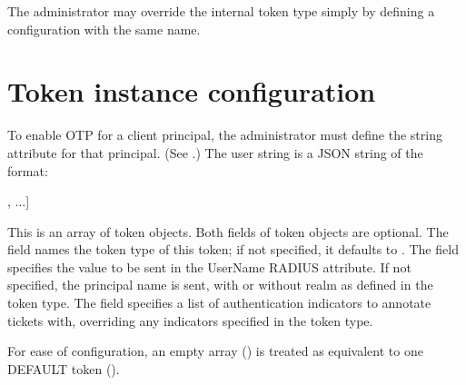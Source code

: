 \documentclass[letterpaper,10pt,english]{sphinxmanual}
\begin{document}
\begin{sphinxVerbatim}[commandchars=\\\{\}]
\PYG{p}{[}\PYG{p}{]}
      
          
\end{sphinxVerbatim}

\sphinxAtStartPar
The administrator may override the internal  token type
simply by defining a configuration with the same name.


\section{Token instance configuration}
\label{\detokenize{admin/otp:token-instance-configuration}}
\sphinxAtStartPar
To enable OTP for a client principal, the administrator must define
the  string attribute for that principal.  (See
{\hyperref[\detokenize{admin/admin_commands/kadmin_local:set-string}]{}}.)  The  user string is a JSON string of the
format:

\begin{sphinxVerbatim}[commandchars=\\\{\}]
[\PYGZob{}
    \PYGZdq{}type\PYGZdq{}: \PYG{n+nt}{\PYGZlt{}string}\PYG{n+nt}{\PYGZgt{}},
    \PYGZdq{}username\PYGZdq{}: \PYG{n+nt}{\PYGZlt{}string}\PYG{n+nt}{\PYGZgt{}},
    \PYGZdq{}indicators\PYGZdq{}: [\PYG{n+nt}{\PYGZlt{}string}\PYG{n+nt}{\PYGZgt{}}, ...]
 \PYGZcb{}, ...]
\end{sphinxVerbatim}

\sphinxAtStartPar
This is an array of token objects.  Both fields of token objects are
optional.  The  field names the token type of this token; if
not specified, it defaults to .  The  field
specifies the value to be sent in the User\sphinxhyphen{}Name RADIUS attribute.  If
not specified, the principal name is sent, with or without realm as
defined in the token type.  The  field specifies a list
of authentication indicators to annotate tickets with, overriding any
indicators specified in the token type.

\sphinxAtStartPar
For ease of configuration, an empty array (\sphinxcode{\sphinxupquote{{[}{]}}}) is treated as
equivalent to one DEFAULT token (\sphinxcode{\sphinxupquote{{[}\{\}{]}}}).
\end{document}
